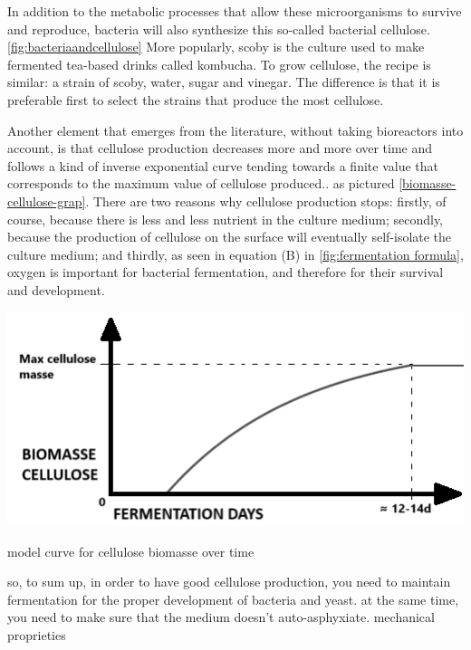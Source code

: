 In addition to the metabolic processes that allow these microorganisms to survive and reproduce, bacteria will also synthesize this so-called bacterial cellulose.\ref{fig:bacteriaandcellulose} 
More popularly, scoby is the culture used to make fermented tea-based drinks called kombucha. 
To grow cellulose, the recipe is similar: a strain of scoby, water, sugar and vinegar. The difference is that it is preferable first to select the strains that produce the most cellulose. 

Another element that emerges from the literature, without taking bioreactors into account, is that cellulose production decreases more and more over time and follows a kind of inverse exponential curve tending towards a finite value that corresponds to the maximum value of cellulose produced.\cite{chong2024modelling}.
as pictured \ref{biomasse-cellulose-grap}. There are two reasons why cellulose production stops: firstly, of course, because there is less and less nutrient in the culture medium; secondly, because the production of cellulose on the surface will eventually self-isolate the culture medium; and thirdly, as seen in equation (B) in \ref{fig:fermentation formula}, oxygen is important for bacterial fermentation, and therefore for their survival and development. 
\begin{marginfigure}[h]
    \centering
    \includegraphics{images/biomasse-cellulose.png}
    \caption{model curve for cellulose biomasse over time}
    \label{fig:biomasse-cellulose-graph}
\end{marginfigure}

so, to sum up, in order to have good cellulose production, you need to maintain fermentation for the proper development of bacteria and yeast. at the same time, you need to make sure that the medium doesn't auto-asphyxiate.
mechanical proprieties






